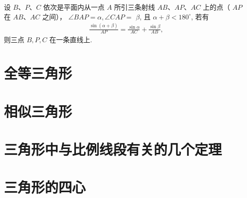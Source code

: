 \documentclass[aspectratio=169]{ctexbeamer}
\theoremstyle{definition}
\begin{document}
\begin{frame}[t]
	\begin{theorem}[张角定理的逆定理]
		设 $B 、 P 、 C$ 依次是平面内从一点 $A$ 所引三条射线 $A B 、 A P 、 A C$ 上的点（ $A P$ 在 $A B 、 A C$ 之间）， $\angle B A P=\alpha, \angle C A P=$ $\beta$, 且 $\alpha+\beta<180^{\circ}$, 若有
		\begin{align*}
			\frac{\sin (\alpha+\beta)}{A P}=\frac{\sin \alpha}{A C}+\frac{\sin \beta}{A B},
		\end{align*}
		则三点 $B, P, C$ 在一条直线上.
	\end{theorem}
\end{frame}


\section{全等三角形}
\section{相似三角形}
\section{三角形中与比例线段有关的几个定理}
\section{三角形的四心}
\end{document}
